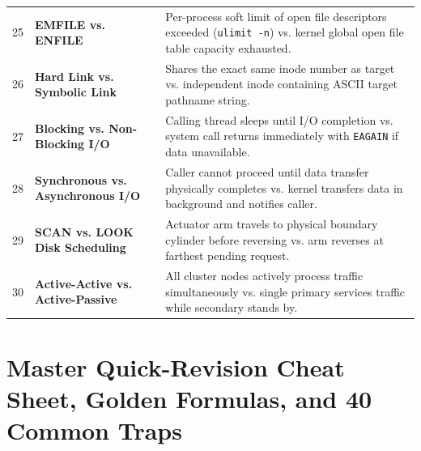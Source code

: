 \begin{table}[htbp]
\begin{tabularx}{\textwidth}{l p{3.2cm} X}
25 & \textbf{EMFILE vs. ENFILE} & Per-process soft limit of open file descriptors exceeded (\texttt{ulimit -n}) vs. kernel global open file table capacity exhausted. \\
26 & \textbf{Hard Link vs. Symbolic Link} & Shares the exact same inode number as target vs. independent inode containing ASCII target pathname string. \\
27 & \textbf{Blocking vs. Non-Blocking I/O} & Calling thread sleeps until I/O completion vs. system call returns immediately with \texttt{EAGAIN} if data unavailable. \\
28 & \textbf{Synchronous vs. Asynchronous I/O} & Caller cannot proceed until data transfer physically completes vs. kernel transfers data in background and notifies caller. \\
29 & \textbf{SCAN vs. LOOK Disk Scheduling} & Actuator arm travels to physical boundary cylinder before reversing vs. arm reverses at farthest pending request. \\
30 & \textbf{Active-Active vs. Active-Passive} & All cluster nodes actively process traffic simultaneously vs. single primary services traffic while secondary stands by. \\
\bottomrule
\end{tabularx}
\end{table}

\section{Master Quick-Revision Cheat Sheet, Golden Formulas, and 40 Common Traps}
\label{sec:os_master_cheat_sheet}

